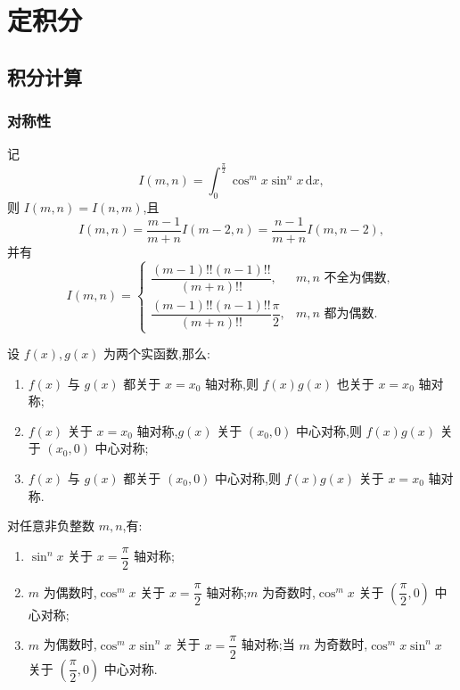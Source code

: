 \setcounter{chapter}{5}
\pagestyle{fancy}

\chapter{定积分}


\section{积分计算}


\subsection{对称性}

\begin{proposition}[\marktwostar]
    记
    \[
        I(m,n)=\int_0^{\frac{\pi}{2}}\cos^m x\sin^n x\,\mathrm{d}x,
    \]
    则 $I(m,n)=I(n,m)$,且
    \[
        I(m,n)=\dfrac{m-1}{m+n}I(m-2,n)
        =\dfrac{n-1}{m+n}I(m,n-2),
    \]
    并有
    \[
        I(m,n)=
        \begin{cases}
            \dfrac{(m-1)!!(n-1)!!}{(m+n)!!},               & m,n\text{ 不全为偶数}, \\[6pt]
            \dfrac{(m-1)!!(n-1)!!}{(m+n)!!}\dfrac{\pi}{2}, & m,n\text{ 都为偶数}.
        \end{cases}
    \]
\end{proposition}

\begin{theorem}[\markstar]
    设 $f(x),g(x)$ 为两个实函数,那么:
    \begin{enumerate}
        \item $f(x)$ 与 $g(x)$ 都关于 $x=x_0$ 轴对称,则 $f(x)g(x)$ 也关于 $x=x_0$ 轴对称;
        \item $f(x)$ 关于 $x=x_0$ 轴对称,$g(x)$ 关于 $(x_0,0)$ 中心对称,则 $f(x)g(x)$ 关于 $(x_0,0)$ 中心对称;
        \item $f(x)$ 与 $g(x)$ 都关于 $(x_0,0)$ 中心对称,则 $f(x)g(x)$ 关于 $x=x_0$ 轴对称.
    \end{enumerate}
\end{theorem}

\begin{corollary}[\markstar]
    对任意非负整数 $m,n$,有:
    \begin{enumerate}
        \item $\sin^n x$ 关于 $x=\dfrac{\pi}{2}$ 轴对称;
        \item $m$ 为偶数时,$\cos^m x$ 关于 $x=\dfrac{\pi}{2}$ 轴对称;$m$ 为奇数时,$\cos^m x$ 关于 $\left(\dfrac{\pi}{2},0\right)$ 中心对称;
        \item $m$ 为偶数时,$\cos^m x\sin^n x$ 关于 $x=\dfrac{\pi}{2}$ 轴对称;当 $m$ 为奇数时,$\cos^m x\sin^n x$ 关于 $\left(\dfrac{\pi}{2},0\right)$ 中心对称.
    \end{enumerate}
\end{corollary}


